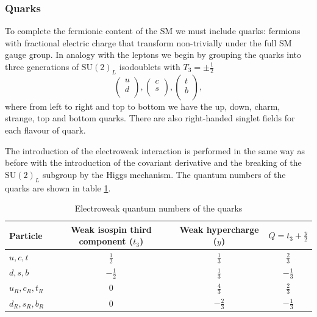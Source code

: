 \subsubsection{Quarks}
To complete the fermionic content of the SM we must include quarks: fermions with fractional electric charge that transform non-trivially under the full SM gauge group. 
In analogy with the leptons we begin by grouping the quarks into three generations of $\mathrm{SU}(2)_{L}$ isodoublets with $T_{3} = \pm\frac{1}{2}$
\begin{equation}
    \label{eq:theory:quark_isodoublets}
    \begin{pmatrix}
        u \\
        d \\
    \end{pmatrix},
    \begin{pmatrix}
        c \\
        s \\
    \end{pmatrix},
    \begin{pmatrix}
        t \\
        b \\
    \end{pmatrix},
\end{equation}
where from left to right and top to bottom we have the up, down, charm, strange, top and bottom quarks. There are also right-handed singlet fields for each flavour of quark. 

The introduction of the electroweak interaction is performed in the same way as before with the introduction of the covariant derivative and the breaking of the $\mathrm{SU}(2)_{L}$ subgroup by the Higgs mechanism. The quantum numbers of the quarks are shown in table \ref{tab:theory:elecroweak_qn_quarks}.
\begin{table}[h!]
\begin{tabular}{ l | c | c | c }
    Particle & Weak isospin third component ($t_{3}$) & Weak hypercharge ($y$) & $Q = t_3 + \frac{y}{2}$ \\
    \hline
    $u,c,t$ & $\frac{1}{2}$ & $\frac{1}{3}$ & $\frac{2}{3}$\\ 
    $d,s,b$ & $-\frac{1}{2}$ & $\frac{1}{3}$ & $-\frac{1}{3}$\\ 
    $u_{R},c_{R},t_{R}$    & $0$ & $\frac{4}{3}$ & $\frac{2}{3}$\\ 
    $d_{R},s_{R},b_{R}$    & $0$ & $-\frac{2}{3}$ & $-\frac{1}{3}$\\ 
\end{tabular}
\caption{Electroweak quantum numbers of the quarks}
\label{tab:theory:elecroweak_qn_quarks}
\end{table}

